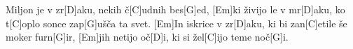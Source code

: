 \documentclass{article}
\begin{document}
\begin{guitar}
[Em]Miljon je v zr[D]aku, nekih č[C]udnih bes[G]ed,
[Em]ki živijo le v mr[D]aku, ko t[C]oplo sonce zap[G]ušča ta svet.
[Em]In iskrice v zr[D]aku, ki bi zan[C]etile še moker furn[G]ir,
[Em]jih netijo oč[D]i, ki si žel[C]ijo teme noč[G]i.
\end{guitar}
\end{document}
